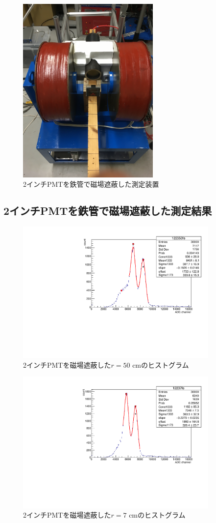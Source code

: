 \begin{figure}[tbp]
	\centering
		\includegraphics[width=7cm]{fig/iguchi/2inchinFe.jpg}
	\caption{2インチPMTを鉄管で磁場遮蔽した測定装置}
	\label{2inchinFe}
\end{figure}


\subsection{2インチPMTを鉄管で磁場遮蔽した測定結果}

\begin{figure}[tbp]
	\centering
		\includegraphics[clip,angle=-90,width=10cm]{fig/iguchi/122350fe.pdf}
	\caption{2インチPMTを磁場遮蔽した$r=50$ cmのヒストグラム}
	\label{hist50fe}
\end{figure}
\begin{figure}[tbp]
	\centering
		\includegraphics[clip,angle=-90,width=10cm]{fig/iguchi/12237fe.pdf}
	\caption{2インチPMTを磁場遮蔽した$r=7$ cmのヒストグラム}
	\label{hist7fe}
\end{figure}

